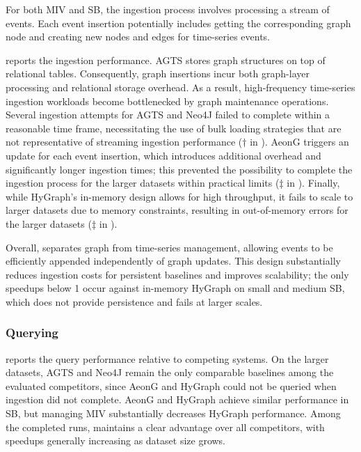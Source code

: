 For both \textsf{MIV} and \textsf{SB}, the ingestion process involves processing a stream of events.
Each event insertion potentially includes getting the corresponding graph node and creating new nodes and edges for time-series events.

 reports the ingestion performance.
AGTS stores graph structures on top of relational tables.
Consequently, graph insertions incur both graph-layer processing and relational storage overhead.
As a result, high-frequency time-series ingestion workloads become bottlenecked by graph maintenance operations. %
Several ingestion attempts for AGTS and Neo4J failed to complete within a reasonable time frame, necessitating the use of bulk loading strategies that are not representative of streaming ingestion performance ($\dagger$ in ).
AeonG triggers an update for each event insertion, which introduces additional overhead and significantly longer ingestion times; this prevented the possibility to complete the ingestion process for the larger datasets within practical limits ($\ddagger$ in ).
Finally, while HyGraph's in-memory design allows for high throughput, it fails to scale to larger datasets due to memory constraints, resulting in out-of-memory errors for the larger datasets ($\ddagger$ in ).

Overall, \ourapproach separates graph from time-series management, allowing events to be efficiently appended independently of graph updates.
This design substantially reduces ingestion costs for persistent baselines and improves scalability; the only speedups below 1 occur against in-memory HyGraph on small and medium \textsf{SB}, which does not provide persistence and fails at larger scales.

\subsubsection{Querying} 

 reports the query performance relative to competing systems.
On the larger datasets, AGTS and Neo4J remain the only comparable baselines among the evaluated competitors, since AeonG and HyGraph could not be queried when ingestion did not complete.
AeonG and HyGraph achieve similar performance in \textsf{SB}, but managing \textsf{MIV} substantially decreases HyGraph performance.
Among the completed runs, \ourapproach maintains a clear advantage over all competitors, with speedups generally increasing as dataset size grows.

